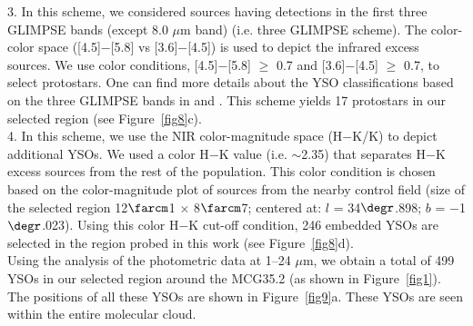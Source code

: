 \documentclass[iop]{emulateapj}
\begin{document}
3. In this scheme, we considered sources having detections in the first three GLIMPSE bands (except 8.0 $\mu$m band) (i.e. three GLIMPSE scheme). 
The color-color space ([4.5]$-$[5.8] vs [3.6]$-$[4.5]) is used to depict the infrared excess sources. 
We use color conditions, [4.5]$-$[5.8] $\ge$ 0.7 and [3.6]$-$[4.5] $\ge$ 0.7, to select protostars.
One can find more details about the YSO classifications based on the three GLIMPSE bands in \citet{hartmann05} and \citet{getman07}. 
This scheme yields 17 protostars in our selected region (see Figure~\ref{fig8}c). \\ 

4. In this scheme, we use the NIR color-magnitude space (H$-$K/K) to depict additional YSOs. 
We used a color H$-$K value (i.e. $\sim$2.35) that separates H$-$K excess sources from the rest of the population.
This color condition is chosen based on the color-magnitude plot of sources from the nearby control field 
(size of the selected region 12$\farcm$1 $\times$ 8$\farcm$7; centered at:  $l$ = 34$\degr$.898; $b$ = $-$1$\degr$.023).
Using this color H$-$K cut-off condition, 246 embedded YSOs are selected in the region probed in this work (see Figure~\ref{fig8}d).\\

Using the analysis of the photometric data at 1--24 $\mu$m, we obtain a total of 499 YSOs in our selected region around 
the MCG35.2 (as shown in Figure~\ref{fig1}). The positions of all these YSOs are shown in Figure~\ref{fig9}a. 
These YSOs are seen within the entire molecular cloud. 
%
\end{document}
